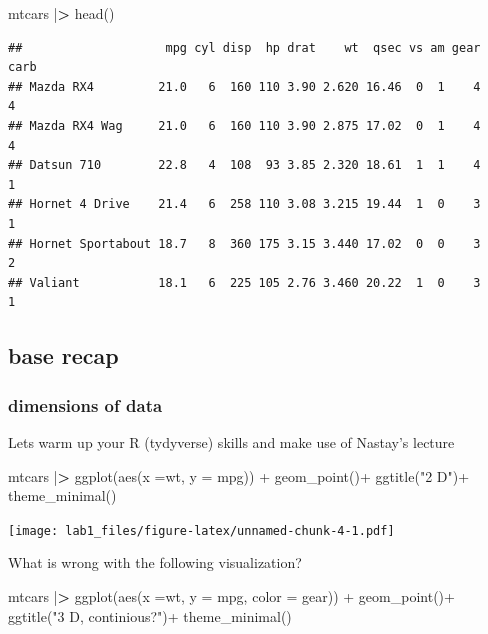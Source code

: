 \documentclass[
]{article}
\newenvironment{Shaded}{\begin{snugshade}}{\end{snugshade}}
\newcommand{\AttributeTok}[1]{\textcolor[rgb]{0.77,0.63,0.00}{#1}}
\newcommand{\ErrorTok}[1]{\textcolor[rgb]{0.64,0.00,0.00}{\textbf{#1}}}
\newcommand{\FunctionTok}[1]{\textcolor[rgb]{0.00,0.00,0.00}{#1}}
\newcommand{\NormalTok}[1]{#1}
\newcommand{\SpecialCharTok}[1]{\textcolor[rgb]{0.00,0.00,0.00}{#1}}
\newcommand{\StringTok}[1]{\textcolor[rgb]{0.31,0.60,0.02}{#1}}
\begin{document}
\begin{Shaded}
\begin{Highlighting}[]
\NormalTok{mtcars }\SpecialCharTok{|}\ErrorTok{\textgreater{}} 
  \FunctionTok{head}\NormalTok{()}
\end{Highlighting}
\end{Shaded}

\begin{verbatim}
##                    mpg cyl disp  hp drat    wt  qsec vs am gear carb
## Mazda RX4         21.0   6  160 110 3.90 2.620 16.46  0  1    4    4
## Mazda RX4 Wag     21.0   6  160 110 3.90 2.875 17.02  0  1    4    4
## Datsun 710        22.8   4  108  93 3.85 2.320 18.61  1  1    4    1
## Hornet 4 Drive    21.4   6  258 110 3.08 3.215 19.44  1  0    3    1
## Hornet Sportabout 18.7   8  360 175 3.15 3.440 17.02  0  0    3    2
## Valiant           18.1   6  225 105 2.76 3.460 20.22  1  0    3    1
\end{verbatim}

\hypertarget{base-recap}{%
\subsection{base recap}\label{base-recap}}

\hypertarget{dimensions-of-data}{%
\subsubsection{dimensions of data}\label{dimensions-of-data}}

Lets warm up your R (tydyverse) skills and make use of Nastay's lecture

\begin{Shaded}
\begin{Highlighting}[]
\NormalTok{mtcars }\SpecialCharTok{|}\ErrorTok{\textgreater{}} 
\FunctionTok{ggplot}\NormalTok{(}\FunctionTok{aes}\NormalTok{(}\AttributeTok{x  =}\NormalTok{wt, }\AttributeTok{y =}\NormalTok{ mpg)) }\SpecialCharTok{+}
  \FunctionTok{geom\_point}\NormalTok{()}\SpecialCharTok{+}
  \FunctionTok{ggtitle}\NormalTok{(}\StringTok{"2 D"}\NormalTok{)}\SpecialCharTok{+}
  \FunctionTok{theme\_minimal}\NormalTok{()}
\end{Highlighting}
\end{Shaded}

\texttt{[image: lab1\_files/figure-latex/unnamed-chunk-4-1.pdf]}

What is wrong with the following visualization?

\begin{Shaded}
\begin{Highlighting}[]
\NormalTok{mtcars }\SpecialCharTok{|}\ErrorTok{\textgreater{}} 
\FunctionTok{ggplot}\NormalTok{(}\FunctionTok{aes}\NormalTok{(}\AttributeTok{x  =}\NormalTok{wt, }\AttributeTok{y =}\NormalTok{ mpg, }\AttributeTok{color =}\NormalTok{ gear)) }\SpecialCharTok{+}
  \FunctionTok{geom\_point}\NormalTok{()}\SpecialCharTok{+}
  \FunctionTok{ggtitle}\NormalTok{(}\StringTok{"3 D, continious?"}\NormalTok{)}\SpecialCharTok{+}
  \FunctionTok{theme\_minimal}\NormalTok{()}
\end{Highlighting}
\end{Shaded}
\end{document}

